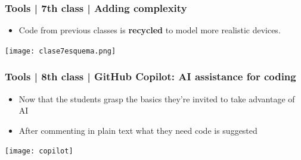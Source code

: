 \documentclass[aspectratio=169]{beamer}
\begin{document}
\begin{frame}
	\frametitle{Tools | 7th class | Adding complexity}
	\begin{block}{}
		\begin{itemize}
			\item Code from previous classes is \textbf{recycled} to model more realistic devices.
		\end{itemize}
	\texttt{[image: clase7esquema.png]}
	\end{block}
\end{frame}


\begin{frame}
	\frametitle{Tools | 8th class | GitHub Copilot: AI assistance for coding}
	\begin{block}{}
		\begin{itemize}
			\item Now that the students grasp the basics they're invited to take advantage of AI
			\item After commenting in plain text what they need code is suggested
		\end{itemize}
	\texttt{[image: copilot]}
	\end{block}
\end{frame}
\end{document}
